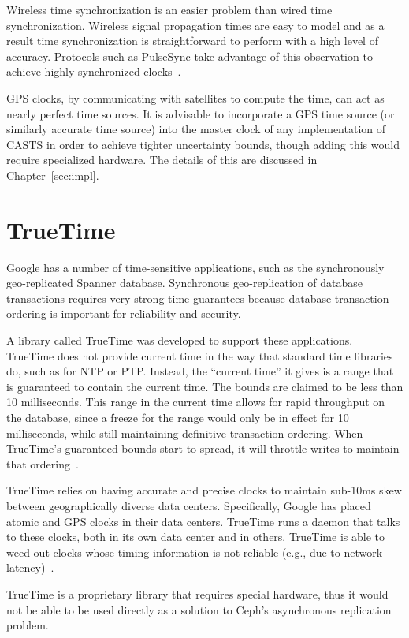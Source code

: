 Wireless time synchronization is an easier problem than wired time 
synchronization. Wireless signal propagation times are easy to model and as a
result time synchronization is straightforward to perform with a high level of
accuracy. Protocols such as PulseSync take advantage of this
observation to achieve highly synchronized clocks~\citep{Lenzen2010}.

GPS clocks, by communicating with satellites to compute the time, can act as 
nearly perfect time sources. It is
advisable to incorporate a GPS time source (or similarly accurate time
source) into the master clock of any implementation of CASTS
in order to achieve tighter uncertainty bounds, though adding this
would require specialized hardware.  The details of this are discussed
in Chapter~\ref{sec:impl}.

\section{TrueTime}

Google has a number of time-sensitive applications, such as the
synchronously geo-replicated Spanner database. Synchronous
geo-replication of database transactions requires very strong time
guarantees because database transaction ordering is important for
reliability and security.

A library called TrueTime was developed to support these applications.
TrueTime does not provide current time in the way that standard time
libraries do, such as for NTP or PTP. Instead, the ``current time'' it
gives is a range that is guaranteed to contain the current
time. The bounds are claimed to be less than 10
milliseconds. This range in the current time allows for rapid
throughput on the database, since a freeze for the range would only be in effect for 10 milliseconds, while still maintaining definitive
transaction ordering. When TrueTime's guaranteed bounds start to
spread, it will throttle writes to maintain that
ordering~\citep{Corbett2012}.

TrueTime relies on having accurate and precise clocks to
maintain sub-10ms skew between geographically diverse data
centers. Specifically, Google has placed atomic and GPS clocks in
their data centers. TrueTime runs a daemon that talks to these clocks,
both in its own data center and in others. TrueTime is able to weed
out clocks whose timing information is not reliable (e.g., due to
network latency)~\citep{Corbett2012}.

TrueTime is a proprietary library that requires special hardware, thus
it would not be able to be used directly as a solution to Ceph's
asynchronous replication problem.

